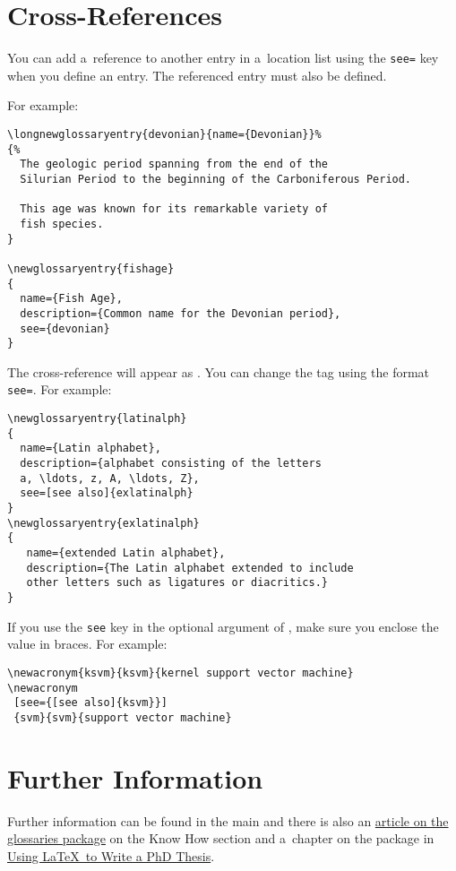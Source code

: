 \documentclass{nlctdoc}
\begin{document}
\section{Cross-References}
\label{sec:xr}

You can add a~reference to another entry in a~location list using
the \texttt{see=} key when you define an entry. 
The referenced entry must also be defined.

For example:
\begin{verbatim}
\longnewglossaryentry{devonian}{name={Devonian}}%
{%
  The geologic period spanning from the end of the 
  Silurian Period to the beginning of the Carboniferous Period.

  This age was known for its remarkable variety of 
  fish species.
}

\newglossaryentry{fishage}
{
  name={Fish Age},
  description={Common name for the Devonian period},
  see={devonian}
}
\end{verbatim}
The cross-reference will appear as . You can
change the  tag using the format
\texttt{see=}. For example:
\begin{verbatim}
\newglossaryentry{latinalph}
{
  name={Latin alphabet},
  description={alphabet consisting of the letters 
  a, \ldots, z, A, \ldots, Z},
  see=[see also]{exlatinalph}
}
\newglossaryentry{exlatinalph}
{
   name={extended Latin alphabet},
   description={The Latin alphabet extended to include 
   other letters such as ligatures or diacritics.}
}
\end{verbatim}
If you use the \texttt{see} key in the optional argument of
, make sure you enclose the value in braces. For
example:
\begin{verbatim}
\newacronym{ksvm}{ksvm}{kernel support vector machine}
\newacronym
 [see={[see also]{ksvm}}]
 {svm}{svm}{support vector machine}
\end{verbatim}

\section{Further Information}
\label{sec:moreinfo}

Further information can be found in the main 
and there is also an
\href{http://www.latex-community.org/index.php?option=com_content&view=article&id=263:glossaries-nomenclature-lists-of-symbols-and-acronyms&catid=55:latex-general&Itemid=114}{article on the glossaries package}
on the 
Know How section and a~chapter on the  package in
\href{http://www.dickimaw-books.com/latex/thesis/}{Using
\LaTeX\ to Write a PhD Thesis}.
\end{document}
